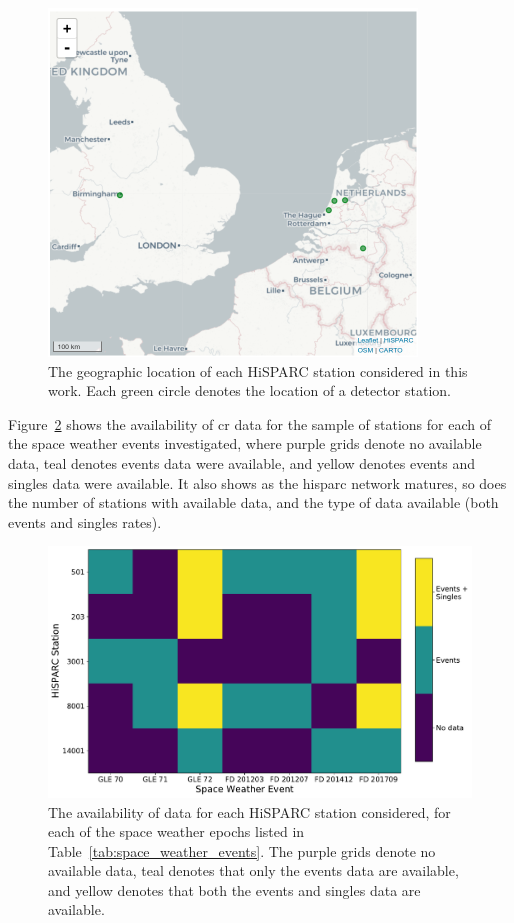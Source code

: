 \begin{figure}[ht!]
	\centering
	\includegraphics[width=0.8\columnwidth]{HS_station_map.pdf}
	\caption{The geographic location of each HiSPARC station considered in this work. Each green circle denotes the location of a detector station.}
	\label{fig:HS_map}
\end{figure}


Figure~\ref{fig:HS_data_availability} shows the availability of \gls{cr} data for the sample of stations for each of the space weather events investigated, where purple grids denote no available data, teal denotes events data were available, and yellow denotes events and singles data were available. It also shows as the \gls{hisparc} network matures, so does the number of stations with available data, and the type of data available (both events and singles rates).

\begin{figure}[ht!]
	\centering
	\includegraphics[width=\columnwidth]{HS_data_availaviblity_map.pdf}
	\caption{The availability of data for each HiSPARC station considered, for each of the space weather epochs listed in Table~\ref{tab:space_weather_events}. The purple grids denote no available data, teal denotes that only the events data are available, and yellow denotes that both the events and singles data are available.}
	\label{fig:HS_data_availability}
\end{figure}





